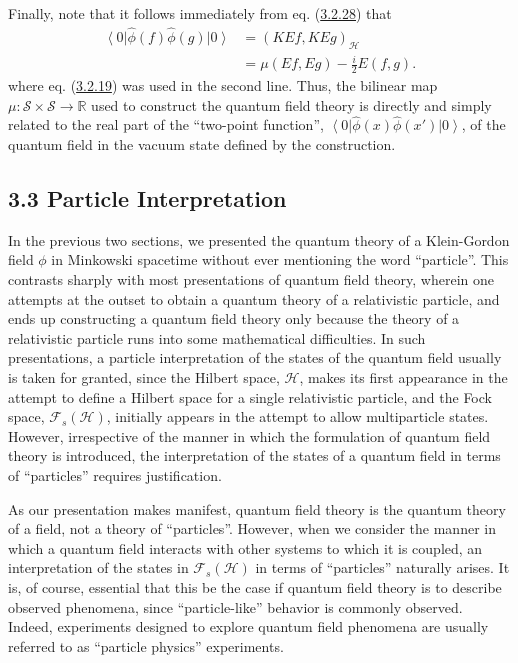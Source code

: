 \documentclass[11pt,a4paper]{article}
\providecommand{\ket}[1]{\left\lvert#1\right\rangle}
\providecommand{\bra}[1]{\left\langle#1\right\rvert}
\begin{document}
Finally, note that it follows immediately from eq. (\hyperref[eq:3.2.28]{3.2.28}) that
\begin{equation*}
\begin{aligned}
\bra{0}\hat\phi(f)\hat\phi(g)\ket{0}
 &=(KEf,KEg)_{\mathcal H}\\
 &=\mu(Ef,Eg)-\frac{i}{2}E(f,g).
\end{aligned}\tag{3.2.32}\label{eq:3.2.32}
\end{equation*}
where eq. (\hyperref[eq:3.2.19]{3.2.19}) was used in the second line. Thus, the bilinear map \(\mu: \mathcal{S}\times\mathcal{S} \to \mathbb{R}\) used to construct the quantum field theory is directly and simply related to the real part of the ``two-point function'', \(\bra0 \hat{\phi}(x)\hat{\phi}(x')\ket{0}\), of the quantum field in the vacuum state defined by the construction.

\subsection*{3.3 Particle Interpretation}\hypertarget{sec:3.3}{}

In the previous two sections, we presented the quantum theory of a Klein-Gordon field \(\phi\) in Minkowski spacetime without ever mentioning the word ``particle''. This contrasts sharply with most presentations of quantum field theory, wherein one attempts at the outset to obtain a quantum theory of a relativistic particle, and ends up constructing a quantum field theory only because the theory of a relativistic particle runs into some mathematical difficulties. In such presentations, a particle interpretation of the states of the quantum field usually is taken for granted, since the Hilbert space, \(\mathcal{H}\), makes its first appearance in the attempt to define a Hilbert space for a single relativistic particle, and the Fock space, \(\mathcal{F}_s(\mathcal{H})\), initially appears in the attempt to allow multiparticle states. However, irrespective of the manner in which the formulation of quantum field theory is introduced, the interpretation of the states of a quantum field in terms of ``particles'' requires justification.

As our presentation makes manifest, quantum field theory is the quantum theory of a field, not a theory of ``particles''. However, when we consider the manner in which a quantum field interacts \hypertarget{source-60}{} with other systems to which it is coupled, an interpretation of the states in \(\mathcal{F}_s(\mathcal{H})\) in terms of ``particles'' naturally arises. It is, of course, essential that this be the case if quantum field theory is to describe observed phenomena, since ``particle-like'' behavior is commonly observed. Indeed, experiments designed to explore quantum field phenomena are usually referred to as ``particle physics'' experiments.
\end{document}
